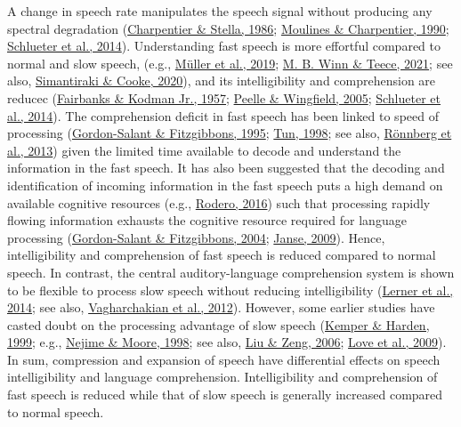 \documentclass[a4paper, nobind]{templates/ociamthesis}
\begin{document}
A change in speech rate manipulates the speech signal without producing any spectral degradation (\protect\hyperlink{ref-Charpentier1986}{Charpentier \& Stella, 1986}; \protect\hyperlink{ref-Moulines1990}{Moulines \& Charpentier, 1990}; \protect\hyperlink{ref-Schlueter2014}{Schlueter et al., 2014}).
Understanding fast speech is more effortful compared to normal and slow speech, (e.g., \protect\hyperlink{ref-Mueller2019}{Müller et al., 2019}; \protect\hyperlink{ref-Winn2021b}{M. B. Winn \& Teece, 2021}; see also, \protect\hyperlink{ref-Simantiraki2020}{Simantiraki \& Cooke, 2020}), and its intelligibility and comprehension are reducec (\protect\hyperlink{ref-Fairbanks1957}{Fairbanks \& Kodman Jr., 1957}; \protect\hyperlink{ref-Peelle2005}{Peelle \& Wingfield, 2005}; \protect\hyperlink{ref-Schlueter2014}{Schlueter et al., 2014}).
The comprehension deficit in fast speech has been linked to speed of processing (\protect\hyperlink{ref-Gordonsalant1995}{Gordon-Salant \& Fitzgibbons, 1995}; \protect\hyperlink{ref-Tun1998}{Tun, 1998}; see also, \protect\hyperlink{ref-Roennberg2013}{Rönnberg et al., 2013}) given the limited time available to decode and understand the information in the fast speech.
It has also been suggested that the decoding and identification of incoming information in the fast speech puts a high demand on available cognitive resources (e.g., \protect\hyperlink{ref-Rodero2016}{Rodero, 2016}) such that processing rapidly flowing information exhausts the cognitive resource required for language processing (\protect\hyperlink{ref-Gordonsalant2004}{Gordon-Salant \& Fitzgibbons, 2004}; \protect\hyperlink{ref-Janse2009}{Janse, 2009}).
Hence, intelligibility and comprehension of fast speech is reduced compared to normal speech.
In contrast, the central auditory-language comprehension system is shown to be flexible to process slow speech without reducing intelligibility (\protect\hyperlink{ref-Lerner2014}{Lerner et al., 2014}; see also, \protect\hyperlink{ref-Vagharchakian2012}{Vagharchakian et al., 2012}).
However, some earlier studies have casted doubt on the processing advantage of slow speech (\protect\hyperlink{ref-Kemper1999}{Kemper \& Harden, 1999}; e.g., \protect\hyperlink{ref-Nejime1998}{Nejime \& Moore, 1998}; see also, \protect\hyperlink{ref-Liu2006}{Liu \& Zeng, 2006}; \protect\hyperlink{ref-Love2009}{Love et al., 2009}).
In sum, compression and expansion of speech have differential effects on speech intelligibility and language comprehension.
Intelligibility and comprehension of fast speech is reduced while that of slow speech is generally increased compared to normal speech.
\end{document}
